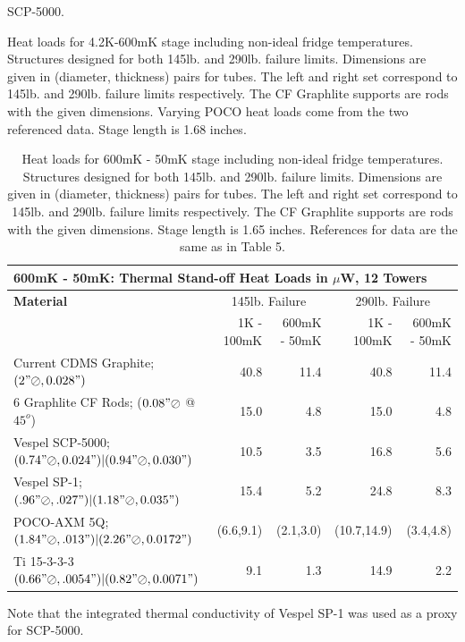 \documentclass{report}
\begin{document}
\begin{table}[h]
\begin{small}
\begin{threeparttable}
\begin{tablenotes}
    SCP-5000.
\end{tablenotes}
\end{threeparttable}
\caption{Heat loads for 4.2K-600mK stage including non-ideal fridge temperatures. Structures designed for both 145lb. and 290lb. failure limits. Dimensions are given in (diameter, thickness) pairs for tubes. The left and right set correspond to 145lb. and 290lb. failure limits respectively. The CF Graphlite supports are rods with the given dimensions. Varying POCO heat loads come from the two referenced data. Stage length is 1.68 inches.}
\end{small}
\end{table}

\begin{table}[h]
\begin{small}
\begin{threeparttable}
\begin{tabular}{lrrrr}
  \multicolumn{5}{l}{{\Large 600mK - 50mK: Thermal Stand-off Heat Loads in $\mu$W, 12 Towers}} \\
\toprule
\bf{{\large Material}}& \multicolumn{2}{c}{145lb. Failure} & \multicolumn{2}{c}{290lb. Failure} \\
\cmidrule(r){2-5}
& 1K - 100mK & 600mK - 50mK & 1K - 100mK & 600mK - 50mK \\
Current CDMS Graphite; $(2"\oslash,0.028")$  & 40.8 & 11.4 & 40.8 & 11.4\\
6 Graphlite CF Rods; ($0.08" \oslash$ @ $45^{o}$) & 15.0 & 4.8 & 15.0 & 4.8 \\
Vespel SCP-5000; $(0.74"\oslash,0.024")|(0.94"\oslash,0.030")$ & 10.5\tnote{\dag} & 3.5\tnote{\dag} & 16.8\tnote{\dag} & 5.6\tnote{\dag} \\
Vespel SP-1; $(.96"\oslash,.027")|(1.18"\oslash,0.035")$ & 15.4 & 5.2 & 24.8 & 8.3 \\
POCO-AXM 5Q; $(1.84"\oslash,.013")|(2.26"\oslash,0.0172")$ & (6.6,9.1) & (2.1,3.0) & (10.7,14.9) & (3.4,4.8) \\
Ti 15-3-3-3 $(0.66"\oslash,.0054")|(0.82"\oslash,0.0071")$ & 9.1\tnote{\S} & 1.3\tnote{\S} & 14.9\tnote{\S} & 2.2\tnote{\S} \\
\bottomrule
\end{tabular}
\begin{tablenotes}
\item[\dag] Note that the integrated thermal conductivity of Vespel SP-1 was used as a proxy for SCP-5000.
\end{tablenotes}
\end{threeparttable}
\caption{Heat loads for 600mK - 50mK stage including non-ideal fridge temperatures. Structures designed for both 145lb. and 290lb. failure limits. Dimensions are given in (diameter, thickness) pairs for tubes. The left and right set correspond to 145lb. and 290lb. failure limits respectively. The CF Graphlite supports are rods with the given dimensions. Stage length is 1.65 inches. References for data are the same as in Table 5.}
\end{small}
\end{table}
\end{document}
